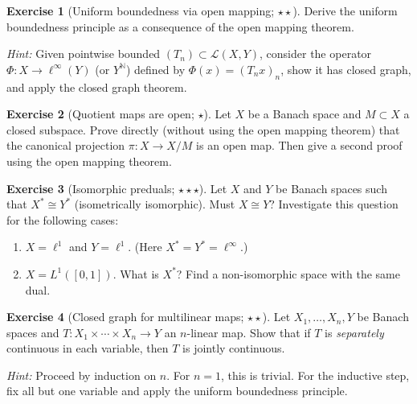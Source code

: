 \documentclass[a4paper,12pt]{book}
\newcommand{\N}{\mathbb{N}}
\theoremstyle{definition}
\newtheorem{exercise}{Exercise}[chapter]
\theoremstyle{plain}
\theoremstyle{remark}
\begin{document}
\begin{exercise}[Uniform boundedness via open mapping; $\star\star$]%
\label{ex:ubp-via-omt}
Derive the uniform boundedness principle as a consequence of the open mapping
theorem.

\noindent\textit{Hint:} Given pointwise bounded $(T_n) \subset \mathcal{L}(X,Y)$,
consider the operator $\Phi \colon X \to \ell^\infty(Y)$ (or $Y^{\N}$) defined by
$\Phi(x) = (T_n x)_n$, show it has closed graph, and apply the closed graph theorem.
\end{exercise}

\begin{exercise}[Quotient maps are open; $\star$]\label{ex:quotient-open}
Let $X$ be a Banach space and $M \subset X$ a closed subspace. Prove directly
(without using the open mapping theorem) that the canonical projection
$\pi \colon X \to X/M$ is an open map. Then give a second proof using the open
mapping theorem.
\end{exercise}

\begin{exercise}[Isomorphic preduals; $\star\star\star$]\label{ex:isomorphic-preduals}
Let $X$ and $Y$ be Banach spaces such that $X^* \cong Y^*$ (isometrically isomorphic).
Must $X \cong Y$? Investigate this question for the following cases:
\begin{enumerate}[label=(\alph*)]
  \item $X = \ell^1$ and $Y = \ell^1$. (Here $X^* = Y^* = \ell^\infty$.)
  \item $X = L^1([0,1])$. What is $X^*$? Find a non-isomorphic space with the
    same dual.
\end{enumerate}
\end{exercise}

\begin{exercise}[Closed graph for multilinear maps; $\star\star$]%
\label{ex:cgt-multilinear}
Let $X_1, \ldots, X_n, Y$ be Banach spaces and
$T \colon X_1 \times \cdots \times X_n \to Y$ an $n$-linear map. Show that if
$T$ is \emph{separately} continuous in each variable, then $T$ is jointly continuous.

\noindent\textit{Hint:} Proceed by induction on $n$. For $n = 1$, this is trivial.
For the inductive step, fix all but one variable and apply the uniform boundedness
principle.
\end{exercise}
\end{document}
